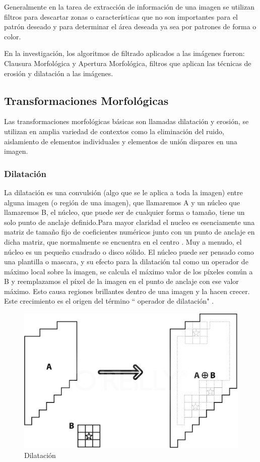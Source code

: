 Generalmente en la tarea de extracción de información de una imagen se utilizan filtros para descartar zonas o características que no son importantes para el patrón deseado y para determinar el área deseada ya sea por patrones de forma o color.

En la investigación, los algoritmos de filtrado aplicados a las imágenes fueron: Clausura Morfológica y Apertura Morfológica, filtros que aplican las técnicas de erosión y dilatación a las imágenes.

\subsection{Transformaciones Morfológicas}\label{sec:Transfor}
Las transformaciones morfológicas básicas son llamadas dilatación y erosión, se utilizan en 
amplia variedad de contextos como la eliminación del ruido, aislamiento de elementos individuales y elementos de unión dispares
en una imagen.\cite{BookOpenCv}

\subsubsection{Dilatación}
La dilatación es una convulsión (algo que se le aplica a toda la imagen) entre alguna imagen (o región de una imagen), que llamaremos A y un núcleo que llamaremos B, el núcleo, que puede ser de cualquier forma o tamaño, tiene un solo punto de anclaje definido.Para mayor claridad el nucleo es esenciamente una matriz de tamaño fijo  de coeficientes numéricos junto con un punto de anclaje en dicha matriz, que normalmente se encuentra en el centro . Muy  a menudo, el núcleo es un pequeño cuadrado o disco sólido. El núcleo puede ser pensado como una plantilla  o mascara, y su efecto para la dilatación tal como un operador de máximo local sobre la imagen, se calcula el m\'aximo valor de los píxeles común a B y reemplazamos el píxel de la imagen en el punto de anclaje con ese valor máximo. Esto causa regiones brillantes dentro de una imagen y la hacen crecer. Este crecimiento es el origen del término `` operador de dilatación" \cite{BookOpenCv}. 

\begin{figure}[hbtp]

\centering
\includegraphics[scale=0.2]{imagenes/erosion-model.png}
\caption{Dilatación}
\end{figure}

